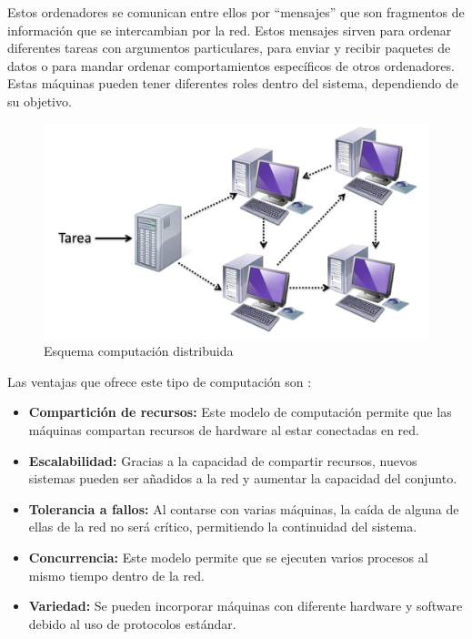 Estos ordenadores se comunican entre ellos por ``mensajes'' que son fragmentos de información que se intercambian por la red. Estos mensajes sirven para ordenar diferentes tareas con argumentos particulares, para enviar y recibir paquetes de datos o para mandar ordenar comportamientos específicos de otros ordenadores. Estas máquinas pueden tener diferentes roles dentro del sistema, dependiendo de su objetivo. 

\begin{figure}[htp!]
	\centering
	\caption{Esquema computación distribuida \cite{fotodistribuida}}
	\label{distribuida}
	\vspace{5pt}
	\includegraphics[scale=0.3]{graphics/computaciondistribuida}
\end{figure}

Las ventajas que ofrece este tipo de computación son \cite{sistDistTeoria}:

\begin{itemize}
\item \textbf{Compartición de recursos:} Este modelo de computación permite que las máquinas compartan recursos de hardware al estar conectadas en red.

\item \textbf{Escalabilidad:} Gracias a la capacidad de compartir recursos, nuevos sistemas pueden ser añadidos a la red y aumentar la capacidad del conjunto.

\item \textbf{Tolerancia a fallos:} Al contarse con varias máquinas, la caída de alguna de ellas de la red no será crítico, permitiendo la continuidad del sistema.

\item \textbf{Concurrencia:} Este modelo permite que se ejecuten varios procesos al mismo tiempo dentro de la red.

\item \textbf{Variedad:} Se pueden incorporar máquinas con diferente hardware y software debido al uso de protocolos estándar.
\end{itemize}

